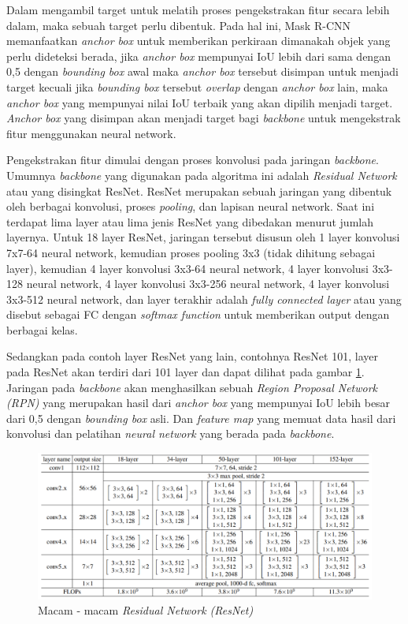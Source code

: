 Dalam mengambil target untuk melatih proses pengekstrakan fitur secara lebih dalam, maka sebuah target
perlu dibentuk. Pada hal ini, Mask R-CNN memanfaatkan \textit{anchor box} untuk memberikan perkiraan
dimanakah objek yang perlu dideteksi berada, jika \textit{anchor box} mempunyai IoU lebih dari sama dengan 0,5
dengan \textit{bounding box} awal maka \textit{anchor box} tersebut disimpan untuk menjadi target
kecuali jika \textit{bounding box} tersebut \textit{overlap} dengan \textit{anchor box} lain, maka
\textit{anchor box} yang mempunyai nilai IoU terbaik yang akan dipilih menjadi target.
\textit{Anchor box} yang disimpan akan menjadi target bagi \textit{backbone} untuk mengekstrak fitur
menggunakan neural network.

Pengekstrakan fitur dimulai dengan proses konvolusi pada jaringan \textit{backbone}. Umumnya
\textit{backbone} yang digunakan pada algoritma ini adalah \textit{Residual Network} atau yang 
disingkat ResNet. ResNet merupakan sebuah jaringan yang dibentuk oleh berbagai konvolusi, proses
\textit{pooling}, dan lapisan neural network. Saat ini terdapat lima layer atau lima jenis ResNet
yang dibedakan menurut jumlah layernya. Untuk 18 layer ResNet, jaringan tersebut disusun oleh 1 layer
konvolusi 7x7-64 neural network, kemudian proses pooling 3x3 (tidak dihitung sebagai layer), kemudian
4 layer konvolusi 3x3-64 neural network, 4 layer konvolusi 3x3-128 neural network, 4 layer konvolusi 3x3-256 neural network,
4 layer konvolusi 3x3-512 neural network, dan layer terakhir adalah \textit{fully connected layer}
atau yang disebut sebagai FC dengan \textit{softmax function} untuk memberikan output dengan berbagai kelas.

Sedangkan pada contoh layer ResNet yang lain, contohnya ResNet 101, layer pada ResNet akan terdiri
dari 101 layer dan dapat dilihat pada gambar \ref{fig: Resnet macam}. Jaringan pada \textit{backbone}
akan menghasilkan sebuah \textit{Region Proposal Network (RPN)} yang merupakan hasil dari \textit{anchor box}
yang mempunyai IoU lebih besar dari 0,5 dengan \textit{bounding box} asli. Dan \textit{feature map} 
yang memuat data hasil dari konvolusi dan pelatihan \textit{neural network} yang berada pada \textit{backbone}.

\begin{figure}[h!]
    \begin{center}
      \includegraphics[width= 1\linewidth]{bab2/ResNet 101-2.png}
      \caption{Macam - macam \textit{Residual Network (ResNet)} \cite{https://doi.org/10.48550/arxiv.1512.03385}}
      \label{fig: Resnet macam}
    \end{center}
\end{figure}

